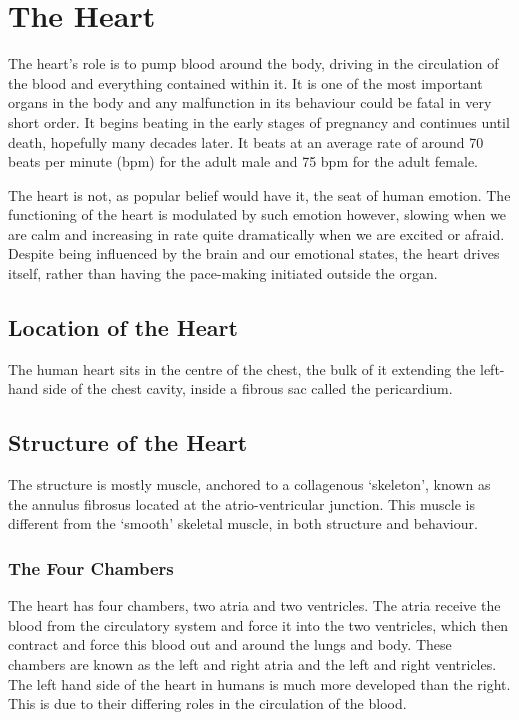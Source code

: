 \section{The Heart}

The heart's role is to pump blood around the body, driving in the circulation of
the blood and everything contained within it.  It is one of the most important
organs in the body and any malfunction in its behaviour could be fatal in very
short order.  It begins beating in the early stages of pregnancy and continues
until death, hopefully many decades later.  It beats at an average rate of
around 70 beats per minute (bpm) for the adult male and 75 bpm for the adult
female.

The heart is not, as popular belief would have it, the seat of human emotion.
The functioning of the heart is modulated by such emotion however, slowing when
we are calm and increasing in rate quite dramatically when we are excited or
afraid.  Despite being influenced by the brain and our emotional states, the
heart drives itself, rather than having the pace-making initiated outside the
organ.

\subsection{Location of the Heart}

The human heart sits in the centre of the chest, the bulk of it extending the
left-hand side of the chest cavity, inside a fibrous sac called the pericardium.

\subsection{Structure of the Heart}

The structure is mostly muscle, anchored to a collagenous `skeleton', known as
the annulus fibrosus located at the atrio-ventricular junction.  This muscle is
different from the `smooth' skeletal muscle, in both structure and behaviour.

\subsubsection{The Four Chambers}

The heart has four chambers, two atria and two ventricles.  The atria receive
the blood from the circulatory system and force it into the two ventricles,
which then contract and force this blood out and around the lungs and body.
These chambers are known as the left and right atria and the left and right
ventricles.  The left hand side of the heart in humans is much more developed
than the right.  This is due to their differing roles in the circulation of the
blood.

